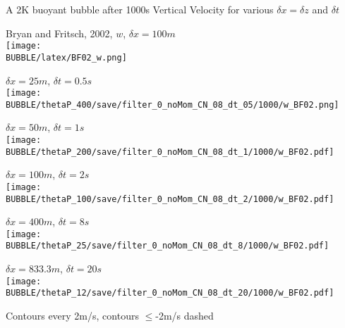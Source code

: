 \begin{slide}
{
    A 2K buoyant bubble after 1000s
    \normalsize\normalfont
    Vertical Velocity for various $\delta x = \delta z$ and $\delta t$
}

\renewcommand{\figWidth}{0.32\linewidth}

\begin{minipage}{\figWidth}\centering
Bryan and Fritsch, 2002, $w$, $\delta x = 100m$ \\
\texttt{[image: \\BUBBLE/latex/BF02\_w.png]}
\end{minipage}
%
\begin{minipage}{\figWidth}\centering
$\delta x = 25m$, $\delta t = 0.5s$ \\
\texttt{[image: \\BUBBLE/thetaP\_400/save/filter\_0\_noMom\_CN\_08\_dt\_05/1000/w\_BF02.png]}
\end{minipage}
%
\begin{minipage}{\figWidth}\centering
$\delta x = 50m$, $\delta t = 1s$ \\
\texttt{[image: \\BUBBLE/thetaP\_200/save/filter\_0\_noMom\_CN\_08\_dt\_1/1000/w\_BF02.pdf]}
\end{minipage}

\begin{minipage}{\figWidth}\centering
$\delta x = 100m$, $\delta t = 2s$ \\
\texttt{[image: \\BUBBLE/thetaP\_100/save/filter\_0\_noMom\_CN\_08\_dt\_2/1000/w\_BF02.pdf]}
\end{minipage}
%
\begin{minipage}{\figWidth}\centering
$\delta x = 400m$, $\delta t = 8s$ \\
\texttt{[image: \\BUBBLE/thetaP\_25/save/filter\_0\_noMom\_CN\_08\_dt\_8/1000/w\_BF02.pdf]}
\end{minipage}
%
\begin{minipage}{\figWidth}\centering
$\delta x = 833.3m$, $\delta t = 20s$ \\
\texttt{[image: \\BUBBLE/thetaP\_12/save/filter\_0\_noMom\_CN\_08\_dt\_20/1000/w\_BF02.pdf]}
\end{minipage}

Contours every 2m/s, contours $\le$-2m/s dashed

\end{slide}

